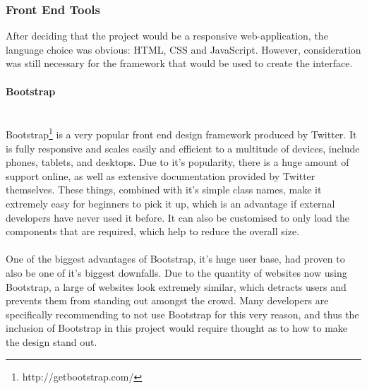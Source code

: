 \subsubsection{Front End Tools}
After deciding that the project would be a responsive web-application, the language choice was obvious: HTML, CSS and JavaScript. However, consideration was still necessary for the framework that would be used to create the interface.

\paragraph{Bootstrap}\ \\
Bootstrap\footnote{http://getbootstrap.com/} is a very popular front end design framework produced by Twitter. It is fully responsive and scales easily and efficient to a multitude of devices, include phones, tablets, and desktops. Due to it's popularity, there is a huge amount of support online, as well as extensive documentation provided by Twitter themselves. These things, combined with it's simple class names, make it extremely easy for beginners to pick it up, which is an advantage if external developers have never used it before. It can also be customised to only load the components that are required, which help to reduce the overall size.\ \\
\ \\
One of the biggest advantages of Bootstrap, it's huge user base, had proven to also be one of it's biggest downfalls. Due to the quantity of websites now using Bootstrap, a large of websites look extremely similar, which detracts users and prevents them from standing out amongst the crowd. Many developers are specifically recommending to not use Bootstrap for this very reason\cite{gross2013bootstrap}, and thus the inclusion of Bootstrap in this project would require thought as to how to make the design stand out.

